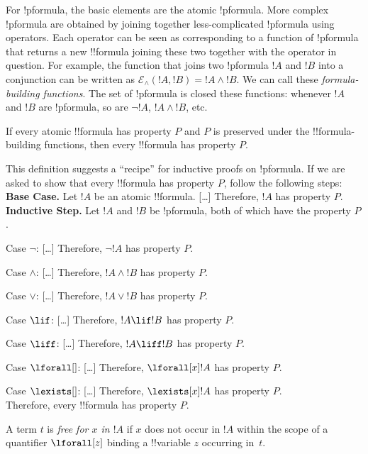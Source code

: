\documentclass[../../include/open-logic-section]{subfiles}
\begin{document}
\begin{explain}
For !p{formula}, the basic elements are the atomic !p{formula}. More complex !p{formula} 
are obtained by joining together less-complicated !p{formula} using operators. Each 
operator can be seen as corresponding to a function of !p{formula} that returns a new 
!!{formula} joining these two together with the operator in question. For example, the function 
that joins two !p{formula} $!A$ and $!B$ into a conjunction can be written as $\mathcal E _\land 
(!A, !B) = !A \land !B$. We can call these \emph{formula-building functions}. The set of 
!p{formula} is closed these functions: whenever $!A$ and $!B$ are !p{formula}, so are 
$\lnot !A$, $!A \land !B$, etc. 
\end{explain}

\begin{defn}
If every atomic !!{formula} has property $P$ and $P$ is preserved under the !!{formula}-building 
functions, then every !!{formula} has property $P$.
\end{defn}

\begin{explain}
This definition suggests a ``recipe'' for inductive proofs on !p{formula}. If we are asked 
to show that every !!{formula} has property $P$, follow the following steps:\\

\textbf{Base Case.} Let $!A$ be an atomic !!{formula}. [\ldots] Therefore, $!A$ has 
property $P$.\\

\textbf{Inductive Step.} Let $!A$ and $!B$ be !p{formula}, both of which have the property $P$.

Case $\lnot$: [\ldots] Therefore, $\lnot !A$ has property $P$.

Case $\land$: [\ldots] Therefore, $!A \land !B$ has property $P$. 

Case $\lor$: [\ldots] Therefore, $!A \lor !B$ has property $P$. 

Case $\lif$: [\ldots] Therefore, $!A \lif !B$ has property $P$.

Case $\liff$: [\ldots] Therefore, $!A \liff !B$ has property $P$.

Case $\lforall[]$: [\ldots] Therefore, $\lforall[x] !A$ has property $P$.

Case $\lexists[]$: [\ldots] Therefore, $\lexists[x] !A$ has property $P$. \\

Therefore, every !!{formula} has property $P$.
\end{explain}

\begin{defn} 
A term $t$ is \emph{free for $x$ in $!A$} if $x$ does not occur in
$!A$ within the scope of a quantifier $\lforall[z]$ binding a !!{variable}
$z$ occurring in~$t$.
\end{defn}

\end{document}

